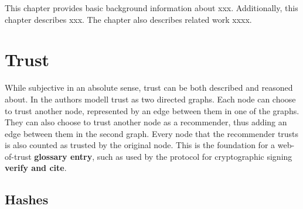 \documentclass[english, biblatex, digitaloutput]{kththesis}
\begin{document}

This chapter provides basic background information about xxx. Additionally, this chapter describes xxx. The chapter also describes related work xxxx.




\section{Trust}

While subjective in an absolute sense, trust can be both described and reasoned about. In \cite{abdui-rahman_distributed_nodate} the authors modell trust as two directed graphs. Each node can choose to trust another node, represented by an edge between them in one of the graphs. They can also choose to trust another node as a recommender, thus adding an edge between them in the second graph. Every node that the recommender trusts is also counted as trusted by the original node. This is the foundation for a web-of-trust \textbf{glossary entry}, such as used by the  protocol for cryptographic signing \textbf{verify and cite}.

\subsection{Hashes}
\end{document}
